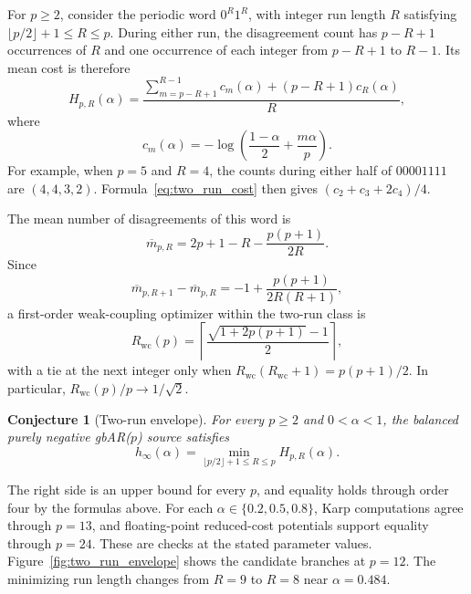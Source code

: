 \documentclass[11pt,a4paper]{article}
\newtheorem{conjecture}[theorem]{Conjecture}
\begin{document}
For $p\ge2$, consider the periodic word $0^R1^R$, with integer run
length $R$ satisfying
$\lfloor p/2\rfloor+1\le R\le p$.  During either run, the disagreement
count has $p-R+1$ occurrences of $R$ and one occurrence of each
integer from $p-R+1$ to $R-1$.  Its mean cost is therefore
\begin{equation}
\label{eq:two_run_cost}
    H_{p,R}(\alpha)
    =\frac{
       \displaystyle\sum_{m=p-R+1}^{R-1}c_m(\alpha)
       +(p-R+1)c_R(\alpha)}{R},
\end{equation}
where
\[
    c_m(\alpha)
    =-\log\left(\frac{1-\alpha}{2}+\frac{m\alpha}{p}\right).
\]
For example, when $p=5$ and $R=4$, the counts during either half of
$00001111$ are $(4,4,3,2)$.  Formula~\eqref{eq:two_run_cost} then gives
$(c_2+c_3+2c_4)/4$.

The mean number of disagreements of this word is
\begin{equation}
\label{eq:two_run_mean}
    \overline m_{p,R}
    =2p+1-R-\frac{p(p+1)}{2R}.
\end{equation}
Since
\[
    \overline m_{p,R+1}-\overline m_{p,R}
    =-1+\frac{p(p+1)}{2R(R+1)},
\]
a first-order weak-coupling optimizer within the two-run class is
\begin{equation}
\label{eq:two_run_weak_optimizer}
    R_{\mathrm{wc}}(p)
    =\left\lceil
       \frac{\sqrt{1+2p(p+1)}-1}{2}
      \right\rceil,
\end{equation}
with a tie at the next integer only when
$R_{\mathrm{wc}}(R_{\mathrm{wc}}+1)=p(p+1)/2$.  In particular,
$R_{\mathrm{wc}}(p)/p\to1/\sqrt2$.

\begin{conjecture}[Two-run envelope]
\label{conj:two_run}
For every $p\ge2$ and $0<\alpha<1$, the balanced purely negative
gbAR($p$) source satisfies
\begin{equation}
\label{eq:two_run_conjecture}
    h_\infty(\alpha)
    =\min_{\lfloor p/2\rfloor+1\le R\le p}
      H_{p,R}(\alpha).
\end{equation}
\end{conjecture}

The right side is an upper bound for every $p$, and equality holds
through order four by the formulas above.  For each
$\alpha\in\{0.2,0.5,0.8\}$, Karp computations agree through $p=13$,
and floating-point reduced-cost potentials support equality through
$p=24$.  These are checks at the stated parameter values.
Figure~\ref{fig:two_run_envelope} shows the candidate branches at
$p=12$.  The minimizing run length changes from $R=9$ to $R=8$
near $\alpha=0.484$.
\end{document}
